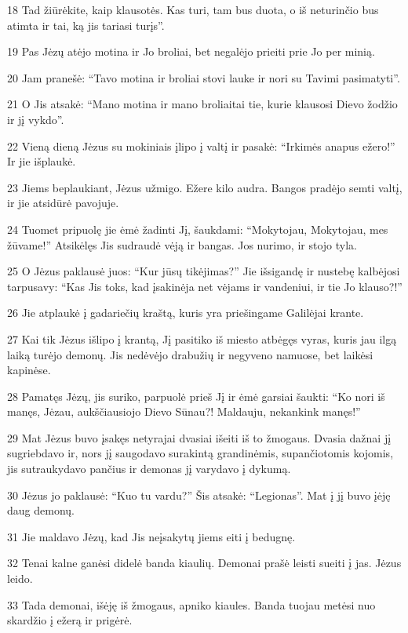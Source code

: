 \par 18 Tad žiūrėkite, kaip klausotės. Kas turi, tam bus duota, o iš neturinčio bus atimta ir tai, ką jis tariasi turįs”. 
\par 19 Pas Jėzų atėjo motina ir Jo broliai, bet negalėjo prieiti prie Jo per minią. 
\par 20 Jam pranešė: “Tavo motina ir broliai stovi lauke ir nori su Tavimi pasimatyti”. 
\par 21 O Jis atsakė: “Mano motina ir mano broliai­tai tie, kurie klausosi Dievo žodžio ir jį vykdo”. 
\par 22 Vieną dieną Jėzus su mokiniais įlipo į valtį ir pasakė: “Irkimės anapus ežero!” Ir jie išplaukė. 
\par 23 Jiems beplaukiant, Jėzus užmigo. Ežere kilo audra. Bangos pradėjo semti valtį, ir jie atsidūrė pavojuje. 
\par 24 Tuomet pripuolę jie ėmė žadinti Jį, šaukdami: “Mokytojau, Mokytojau, mes žūvame!” Atsikėlęs Jis sudraudė vėją ir bangas. Jos nurimo, ir stojo tyla. 
\par 25 O Jėzus paklausė juos: “Kur jūsų tikėjimas?” Jie išsigandę ir nustebę kalbėjosi tarpusavy: “Kas Jis toks, kad įsakinėja net vėjams ir vandeniui, ir tie Jo klauso?!” 
\par 26 Jie atplaukė į gadariečių kraštą, kuris yra priešingame Galilėjai krante. 
\par 27 Kai tik Jėzus išlipo į krantą, Jį pasitiko iš miesto atbėgęs vyras, kuris jau ilgą laiką turėjo demonų. Jis nedėvėjo drabužių ir negyveno namuose, bet laikėsi kapinėse. 
\par 28 Pamatęs Jėzų, jis suriko, parpuolė prieš Jį ir ėmė garsiai šaukti: “Ko nori iš manęs, Jėzau, aukščiausiojo Dievo Sūnau?! Maldauju, nekankink manęs!” 
\par 29 Mat Jėzus buvo įsakęs netyrajai dvasiai išeiti iš to žmogaus. Dvasia dažnai jį sugriebdavo ir, nors jį saugodavo surakintą grandinėmis, supančiotomis kojomis, jis sutraukydavo pančius ir demonas jį varydavo į dykumą. 
\par 30 Jėzus jo paklausė: “Kuo tu vardu?” Šis atsakė: “Legionas”. Mat į jį buvo įėję daug demonų. 
\par 31 Jie maldavo Jėzų, kad Jis neįsakytų jiems eiti į bedugnę. 
\par 32 Tenai kalne ganėsi didelė banda kiaulių. Demonai prašė leisti sueiti į jas. Jėzus leido. 
\par 33 Tada demonai, išėję iš žmogaus, apniko kiaules. Banda tuojau metėsi nuo skardžio į ežerą ir prigėrė. 
